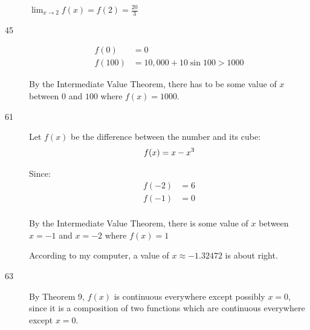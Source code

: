 \documentclass[letterpaper, landscape]{exam}
\begin{document}
\begin{description}
        $\lim_{x \to 2} f(x) = f(2) = \frac{20}{3}$



      \item[45]
        \begin{align*}
          f(0) &= 0 \\
          f(100) &= 10,000 + 10 \sin 100 > 1000
        \end{align*}

        By the Intermediate Value Theorem, there has to be some value of $x$ between
        $0$ and $100$ where $f(x) = 1000$.

      \item[61]
        Let $f(x)$ be the difference between the number and its cube:
        \[
          f(x) = x - x^3  \\
        \]

        Since:
        \begin{align*}
          f(-2) &= 6 \\
          f(-1) &= 0 \\
        \end{align*}

        By the Intermediate Value Theorem, there is some value of $x$ between $x = -1$ and
        $x = -2$ where $f(x) = 1$

        According to my computer, a value of $x \approx -1.32472$ is about right.

      \item[63]
        By Theorem 9, $f(x)$ is continuous everywhere except possibly $x = 0$, since it is
        a composition of two functions which are continuous everywhere except $x = 0$.


\end{description}
\end{document}

